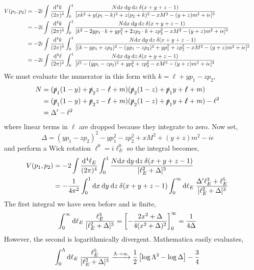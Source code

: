 \documentclass[12pt]{article}
\begin{document}
\begin{align*}
V(p_1, p_2) & = -2i \int \frac{\mathrm{d}^4 k}{(2 \pi)^4} \int_0^1 \frac{N \mathrm{d}x \: \mathrm{d}y \: \mathrm{d}z \: \delta(x + y + z - 1)}{[x k^2 + y (p_1 - k)^2 + z (p_2 + k)^2 - x M^2 - (y + z) m^2 + i \epsilon]^3}
\\
& = -2i \int \frac{\mathrm{d}^4 k}{(2 \pi)^4} \int_0^1 \frac{N \mathrm{d}x \: \mathrm{d}y \: \mathrm{d}z \: \delta(x + y + z - 1)}{[k^2 - 2 y p_1 \cdot k + y p_1^2 + 2 z p_2 \cdot k + z p_2^2 - x M^2 - (y + z) m^2 + i \epsilon]^3}
\\
& = -2i \int \frac{\mathrm{d}^4 k}{(2 \pi)^4} \int_0^1 \frac{N \mathrm{d}x \: \mathrm{d}y \: \mathrm{d}z \: \delta(x + y + z - 1)}{[(k - yp_1 + z p_2)^2 - (y p_1 - z p_2)^2 + y p_1^2 + z p_2^2 - x M^2 - (y + z) m^2 + i \epsilon]^3}
\\
& = -2i \int \frac{\mathrm{d}^4 \ell}{(2 \pi)^4} \int_0^1 \frac{N \mathrm{d}x \: \mathrm{d}y \: \mathrm{d}z \: \delta(x + y + z - 1)}{[\ell^2 - (y p_1 - z p_2)^2 + y p_1^2 + z p_2^2 - x M^2 - (y + z) m^2 + i \epsilon]^3}
\end{align*}
We must evaluate the numerator in this form with $k = \ell + y p_1 - z p_2$,
\begin{align*}
N & = (\slashed{p}_1(1 - y) + \slashed{p}_2 z - \slashed{\ell} + m)(\slashed{p}_2(1 - z) + \slashed{p}_1 y + \slashed{\ell} + m)
\\
& = (\slashed{p}_1(1 - y) + \slashed{p}_2 z - \slashed{\ell} + m)(\slashed{p}_2(1 - z) + \slashed{p}_1 y + \slashed{\ell} + m) - \ell^2
\\
& = \Delta' - \ell^2
\end{align*}
where linear terms in $\ell$ are dropped because they integrate to zero. Now set,
\[ \Delta = (y p_1 - z p_2)^2 - y p_1^2 - z p_2^2 + x M^2 + (y + z) m^2 - i \epsilon\] 
and perform a Wick rotation $\ell^0 = i \ell_E^0$ so the integral becomes,
\begin{align*}
V(p_1, p_2) & = -2 \int \frac{\mathrm{d}^4 \ell_E}{(2 \pi)^4} \int_0^1 \frac{N \mathrm{d}x \: \mathrm{d}y \: \mathrm{d}z \: \delta(x + y + z - 1)}{[\ell_E^2 + \Delta]^3}
\\
& = - \frac{1}{4 \pi^2} \int_0^1 \mathrm{d}x \: \mathrm{d}y \: \mathrm{d}z \: \delta(x + y + z - 1) \int_{0}^\infty \mathrm{d}\ell_E \: \frac{\Delta' \ell_E^3 + \ell_E^5}{[\ell_E^2 + \Delta]^3}
\end{align*}
The first integral we have seen before and is finite,
\[ \int_{0}^\infty \mathrm{d}\ell_E \: \frac{\ell_E^3}{[\ell_E^2 + \Delta]^3} = \left[ -\frac{2 x^2 + \Delta}{4(x^2 + \Delta)^2} \right]_{0}^\infty = \frac{1}{4 \Delta} \]
However, the second is logarithmically divergent. Mathematica easily evaluates,
\[ \int_0^{\Lambda} \mathrm{d}\ell_E \: \frac{\ell_E^5}{[\ell_E^2 + \Delta]^3} \xrightarrow{\Lambda \to \infty} \frac{1}{2} \left[ \log{\Lambda^2} - \log{\Delta} \right] - \frac{3}{4} \]
\end{document}
